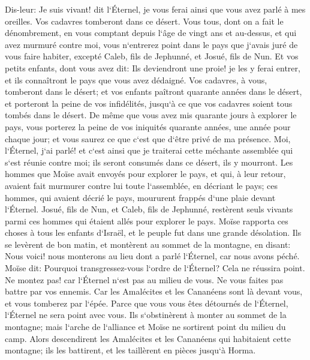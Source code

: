 \verse Dis-leur: Je suis vivant! dit l`Éternel, je vous ferai ainsi que vous avez parlé à mes oreilles. 
\verse Vos cadavres tomberont dans ce désert. Vous tous, dont on a fait le dénombrement, en vous comptant depuis l`âge de vingt ans et au-dessus, et qui avez murmuré contre moi, 
\verse vous n`entrerez point dans le pays que j`avais juré de vous faire habiter, excepté Caleb, fils de Jephunné, et Josué, fils de Nun. 
\verse Et vos petits enfants, dont vous avez dit: Ils deviendront une proie! je les y ferai entrer, et ils connaîtront le pays que vous avez dédaigné. 
\verse Vos cadavres, à vous, tomberont dans le désert; 
\verse et vos enfants paîtront quarante années dans le désert, et porteront la peine de vos infidélités, jusqu`à ce que vos cadavres soient tous tombés dans le désert. 
\verse De même que vous avez mis quarante jours à explorer le pays, vous porterez la peine de vos iniquités quarante années, une année pour chaque jour; et vous saurez ce que c`est que d`être privé de ma présence. 
\verse Moi, l`Éternel, j`ai parlé! et c`est ainsi que je traiterai cette méchante assemblée qui s`est réunie contre moi; ils seront consumés dans ce désert, ils y mourront. 
\verse Les hommes que Moïse avait envoyés pour explorer le pays, et qui, à leur retour, avaient fait murmurer contre lui toute l`assemblée, en décriant le pays; 
\verse ces hommes, qui avaient décrié le pays, moururent frappés d`une plaie devant l`Éternel. 
\verse Josué, fils de Nun, et Caleb, fils de Jephunné, restèrent seuls vivants parmi ces hommes qui étaient allés pour explorer le pays. 
\verse Moïse rapporta ces choses à tous les enfants d`Israël, et le peuple fut dans une grande désolation. 
\verse Ils se levèrent de bon matin, et montèrent au sommet de la montagne, en disant: Nous voici! nous monterons au lieu dont a parlé l`Éternel, car nous avons péché. 
\verse Moïse dit: Pourquoi transgressez-vous l`ordre de l`Éternel? Cela ne réussira point. 
\verse Ne montez pas! car l`Éternel n`est pas au milieu de vous. Ne vous faites pas battre par vos ennemis. 
\verse Car les Amalécites et les Cananéens sont là devant vous, et vous tomberez par l`épée. Parce que vous vous êtes détournés de l`Éternel, l`Éternel ne sera point avec vous. 
\verse Ils s`obstinèrent à monter au sommet de la montagne; mais l`arche de l`alliance et Moïse ne sortirent point du milieu du camp. 
\verse Alors descendirent les Amalécites et les Cananéens qui habitaient cette montagne; ils les battirent, et les taillèrent en pièces jusqu`à Horma. 

